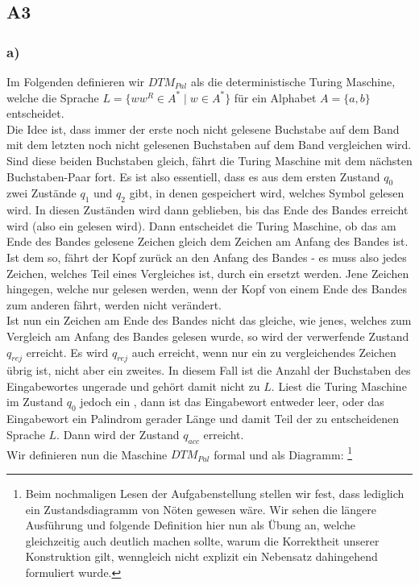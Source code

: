 \documentclass[12pt, a4paper]{article}
\begin{document}
\subsection*{A3}
\subsubsection*{a)}
Im Folgenden definieren wir \(DTM_{Pal}\) als die deterministische Turing Maschine, welche die Sprache \(L = \{ww^R \in A^* \mid w \in A^*\}\)
für ein Alphabet \(A = \{a,b\}\) entscheidet.\\
Die Idee ist, dass immer der erste noch nicht gelesene Buchstabe auf dem Band mit dem 
letzten noch nicht gelesenen Buchstaben auf dem Band vergleichen wird. Sind diese beiden 
Buchstaben gleich, fährt die Turing Maschine mit dem nächsten Buchstaben-Paar fort. Es ist also 
essentiell, dass es aus dem ersten Zustand \(q_0\) zwei Zustände \(q_1\) und \(q_2\) gibt, in 
denen gespeichert wird, welches Symbol gelesen wird. In diesen Zuständen wird dann geblieben, bis 
das Ende des Bandes erreicht wird (also ein \textvisiblespace gelesen wird). Dann entscheidet die 
Turing Maschine, ob das am Ende des Bandes gelesene Zeichen gleich dem Zeichen am Anfang des Bandes 
ist. Ist dem so, fährt der Kopf zurück an den Anfang des Bandes - es muss also jedes 
Zeichen, welches Teil eines Vergleiches ist, durch ein \textvisiblespace ersetzt werden. 
Jene Zeichen hingegen, welche nur gelesen werden, wenn der Kopf von einem Ende des Bandes zum 
anderen fährt, werden nicht verändert. \\
Ist nun ein Zeichen am Ende des Bandes nicht das gleiche, wie jenes, welches zum Vergleich am 
Anfang des Bandes gelesen wurde, so wird der verwerfende Zustand \(q_{rej}\) erreicht. Es wird \(q_{rej}\) auch 
erreicht, wenn nur ein zu vergleichendes Zeichen übrig ist, nicht aber ein zweites. In diesem 
Fall ist die Anzahl der Buchstaben des Eingabewortes ungerade und gehört damit nicht zu \(L\). Liest die 
Turing Maschine im Zustand \(q_0\) jedoch ein \textvisiblespace, dann ist das Eingabewort entweder 
leer, oder das Eingabewort ein Palindrom gerader Länge und damit Teil der zu entscheidenen Sprache \(L\). 
Dann wird der Zustand \(q_{acc}\) erreicht. \\
Wir definieren nun die Maschine \(DTM_{Pal}\) formal und als Diagramm: \footnote[3]{Beim nochmaligen 
Lesen der Aufgabenstellung stellen wir fest, dass lediglich ein Zustandsdiagramm von Nöten gewesen 
wäre. Wir sehen die längere Ausführung und folgende Definition hier nun als Übung an, welche gleichzeitig auch 
deutlich machen sollte, warum die Korrektheit unserer Konstruktion gilt, wenngleich nicht 
explizit ein Nebensatz dahingehend formuliert wurde.}\\
\end{document}
